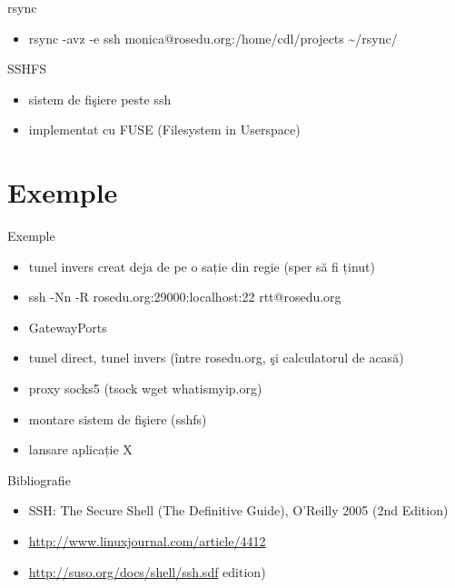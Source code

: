 \documentclass{beamer}
\begin{document}
\begin{frame}{rsync}
  \begin{itemize}
    \item rsync -avz -e ssh monica@rosedu.org:/home/cdl/projects
\~{}/rsync/
  \end{itemize}
\end{frame}

\begin{frame}{SSHFS}
	\begin{itemize}
	\item sistem de fişiere peste ssh
	\item implementat cu FUSE (Filesystem in Userspace)
	\end{itemize}
\end{frame}

\section{Exemple}
\frame{\tableofcontents[currentsection]}
\begin{frame}{Exemple}
	\begin{itemize}
	\item tunel invers creat deja de pe o sație din regie (sper să fi ținut) 
	\item ssh -Nn -R rosedu.org:29000:localhost:22 rtt@rosedu.org
	\item GatewayPorts
	\item tunel direct, tunel invers (între rosedu.org, şi calculatorul de
	acasă)
	\item proxy socks5	(tsock wget whatismyip.org)
	\item montare sistem de fişiere (sshfs)
	\item lansare aplicație X
	\end{itemize}
\end{frame}

\begin{frame}{Bibliografie}
  \begin{itemize}
    \item SSH: The Secure Shell (The Definitive Guide), O'Reilly 2005 (2nd
Edition)
    \item \url{http://www.linuxjournal.com/article/4412}
    \item \url{http://suso.org/docs/shell/ssh.sdf}
edition)
  \end{itemize}
\end{frame}
\end{document}
